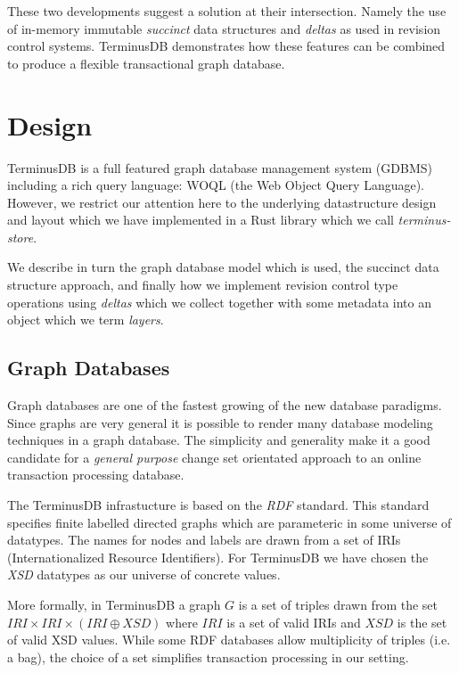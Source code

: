 \documentclass[10pt, a4paper, twocolumn]{article} %
\begin{document}
These two developments suggest a solution at their
intersection. Namely the use of in-memory immutable {\em succinct}
data structures and {\em deltas} as used in revision control
systems. TerminusDB demonstrates how these features can be combined to
produce a flexible transactional graph database. 

\section{Design}

TerminusDB is a full featured graph database management system (GDBMS)
including a rich query language: WOQL (the Web Object Query Language).
However, we restrict our attention here to the underlying
datastructure design and layout which we have implemented in a
Rust\cite{} library which we call {\em{terminus-store}}.

We describe in turn the graph database model which is used, the
succinct data structure approach, and finally how we implement
revision control type operations using {\em deltas} which we collect
together with some metadata into an object which we term {\em layers}.

\subsection{Graph Databases}

Graph databases are one of the fastest growing of the new database
paradigms\cite{}. Since graphs are very general it is possible to
render many database modeling techniques in a graph database. The
simplicity and generality make it a good candidate for a {\em general
purpose} change set orientated approach to an online transaction
processing database.

The TerminusDB infrastucture is based on the {\em RDF} standard. This
standard specifies finite labelled directed graphs which are
parameteric in some universe of datatypes. The names for nodes and
labels are drawn from a set of IRIs (Internationalized Resource
Identifiers). For TerminusDB we have chosen the {\em XSD} datatypes as
our universe of concrete values.

More formally, in TerminusDB a graph \(G\) is a set of triples drawn
from the set \( IRI \times IRI \times (IRI \oplus XSD)\) where \(IRI\)
is a set of valid IRIs and \(XSD\) is the set of valid XSD values.
While some RDF databases allow multiplicity of triples (i.e. a bag),
the choice of a set simplifies transaction processing in our setting.
\end{document}
